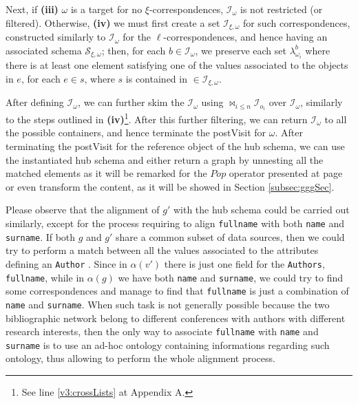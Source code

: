 \begin{example}[continues=ex:examplegraphdata,label=ex:examplereferencedOcaml]
{\narrower Next, if \textbf{(iii)} $\omega$ is a target for no $\xi$-correspondences, $\mathcal{I}_\omega$ is not restricted (or filtered). Otherwise, \textbf{(iv)} we must first create a set $\mathcal{I}_{\xi,\omega}$ for such correspondences, constructed similarly to $\mathcal{I}_\omega$ for the $\ell$-correspondences, and hence having an associated schema $\mathcal{S}_{\xi,\omega}$; then, for each $b\in \mathcal{I}_\omega$, we preserve each set $\lambda_{\omega_i}^b$ where there is at least one element satisfying one of the values associated to the objects in $e$, for each $e\in s$, where $s$ is contained in $\in\mathcal{I}_{\xi,\omega}$.\par}
\medskip

After defining $\mathcal{I}_\omega$, we can further skim the $\mathcal{I}_\omega$ using $\bowtie_{i\leq n}\mathcal{I}_{o_i}$ over $\mathcal{I}_\omega$, similarly to the steps outlined in \textbf{(iv)}\footnote{See line \vref{v3:crossLists} at Appendix A.}. After this further filtering, we can return $\mathcal{I}_\omega$ to all the possible containers, and hence terminate the postVisit for $\omega$. After terminating the postVisit for the reference object of the hub schema, we can use the instantiated hub schema and either return a graph by unnesting all the matched elements as it will be remarked for the $Pop$ operator presented at page \pageref{eq:popGraph} or even transform the content, as it will be showed in Section \vref{subsec:gggSec}. 



Please observe that the alignment of $g'$ with the hub schema could be carried out similarly, except for the process requiring to align \texttt{fullname} with both \texttt{name} and \texttt{surname}. If both $g$ and $g'$ share a common subset of data sources, then we could try to perform a match between all the values associated to the attributes defining an \texttt{Author} \cite{Jagadish}. Since in $\alpha(v')$ there is just one field for the \texttt{Authors}, \texttt{fullname}, while in $\alpha(g)$ we have both \texttt{name} and \texttt{surname}, we could  try to find some correspondences and manage to find that \texttt{fullname} is just a combination of \texttt{name} and \texttt{surname}. When such task is not generally possible because the two bibliographic network belong to different conferences with authors with different research interests, then the only way to associate \texttt{fullname} with \texttt{name} and \texttt{surname} is to use an ad-hoc ontology containing informations regarding such ontology, thus allowing to perform the whole alignment process.
\end{example}

